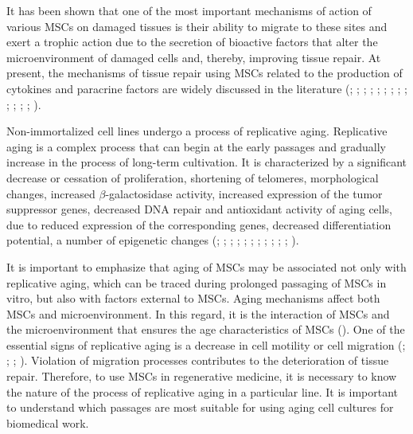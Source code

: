 \documentclass[english,authoryear]{elsarticle}
\begin{document}
It has been shown that one of the most important mechanisms of action of various MSCs on damaged tissues is their ability to migrate to these sites and exert a trophic action due to the secretion of bioactive factors that alter the microenvironment of damaged cells and, thereby, improving tissue repair.
At present, the mechanisms of tissue repair using MSCs related to the production of cytokines and paracrine factors are widely discussed in the literature (\cite{phinney2007concise}; \cite{m2011mesenchymal}; \cite{guiducci2011bone}; \cite{gruenloh2011characterization}; \cite{huang2013effects}; \cite{luo2013mesenchymal}; \cite{ando2014stem}; \cite{hendijani2015human}; \cite{hendijani2015effect}; \cite{danieli2016testing}; \cite{julianto2016topical}; \cite{teixeira2017impact}; \cite{vulcano2016wharton}; \cite{zachar2016activation}).


Non-immortalized cell lines undergo a process of replicative aging. Replicative aging is a complex process that can begin at the early passages and gradually increase in the process of long-term cultivation.
It is characterized by a significant decrease or cessation of proliferation, shortening of telomeres, morphological changes, increased $\beta$-galactosidase activity, increased expression of the tumor suppressor genes, decreased DNA repair and antioxidant activity of aging cells, due to reduced expression of the corresponding genes, decreased differentiation potential, a number of epigenetic changes (\cite{wagner2008replicative}; \cite{kuilman2010essence}; \cite{redaelli2012cytogenomic}; \cite{estrada2013human}; \cite{savickiene2016senescence}; \cite{danisovic2017effect}; \cite{koltsova2018dynamics}; \cite{alessio2018mesenchymal}; \cite{krylova2018isolation}; \cite{niedernhofer2018nuclear}; \cite{truong2018characterization}; \cite{yu2018replicative}).


It is important to emphasize that aging of MSCs may be associated not only with replicative aging, which can be traced during prolonged passaging of MSCs in vitro, but also with factors external to MSCs.
Aging mechanisms affect both MSCs and microenvironment.
In this regard, it is the interaction of MSCs and the microenvironment that ensures the age characteristics of MSCs (\cite{sethe2006aging}).
One of the essential signs of replicative aging is a decrease in cell motility or cell migration (\cite{geissler2012functional}; \cite{bertolo2015vitro}; \cite{turinetto2016senescence}; \cite{zhang2018overexpression}).
Violation of migration processes contributes to the deterioration of tissue repair.
Therefore, to use MSCs in regenerative medicine, it is necessary to know the nature of the process of replicative aging in a particular line.
It is important to understand which passages are most suitable for using aging cell cultures for biomedical work.
\end{document}
